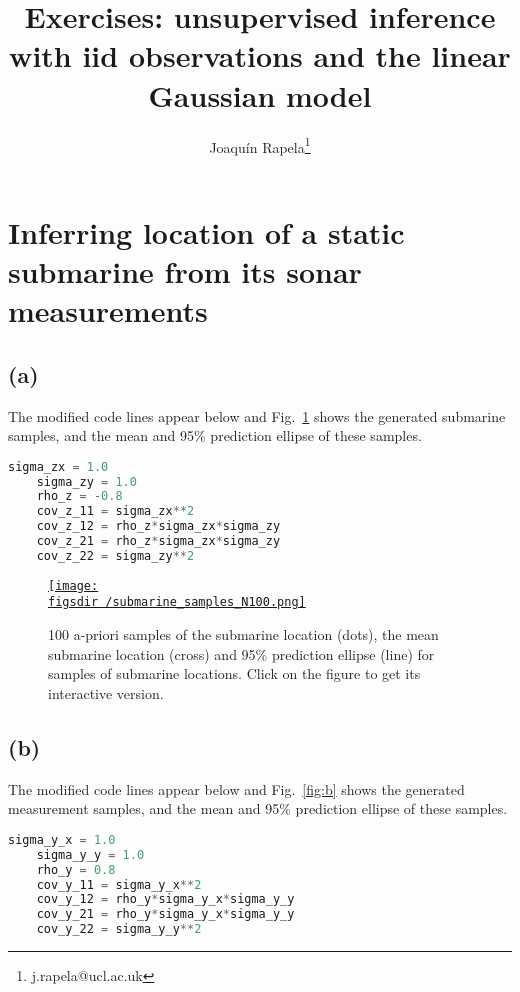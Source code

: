 \documentclass[12pt]{article}
\def\figsdir{../../../../../../code/scripts/probability/unsupervisedInferenceInTheLinearGaussianModel/figures/}
\def\figsURLdir{http://www.gatsby.ucl.ac.uk/~rapela/gcnuBridging2023/lectures/9_inference/inferenceInTheLinearGaussianModel/exercises/figures/}
\begin{document}
\title{Exercises: unsupervised inference with iid observations and the linear Gaussian model}
\author{Joaqu\'{i}n Rapela\thanks{j.rapela@ucl.ac.uk}}

\maketitle

\section{Inferring location of a static submarine from its sonar
measurements}

\subsection*{(a)} The modified code lines appear below and Fig.~\ref{fig:a}
shows the generated submarine samples, and the mean and 95\% prediction ellipse
of these samples.

\begin{lstlisting}[language=Python,frame=single]
    sigma_zx = 1.0
    sigma_zy = 1.0
    rho_z = -0.8
    cov_z_11 = sigma_zx**2
    cov_z_12 = rho_z*sigma_zx*sigma_zy
    cov_z_21 = rho_z*sigma_zx*sigma_zy
    cov_z_22 = sigma_zy**2
\end{lstlisting}

\begin{center}
    \begin{figure}[H]
        \href{\figsURLdir/submarine_samples_N100.html}{\texttt{[image: \\figsdir /submarine\_samples\_N100.png]}}

        \caption{100 a-priori samples of the submarine location (dots), the
        mean submarine location (cross) and 95\% prediction ellipse (line) for
        samples of submarine locations. Click on the figure to get its
        interactive version.}

        \label{fig:a}
    \end{figure}
\end{center}

\subsection*{(b)} The modified code lines appear below and Fig.~\ref{fig:b}
shows the generated measurement samples, and the mean and 95\% prediction
ellipse of these samples.

\begin{lstlisting}[language=Python,frame=single]
    sigma_y_x = 1.0
    sigma_y_y = 1.0
    rho_y = 0.8
    cov_y_11 = sigma_y_x**2
    cov_y_12 = rho_y*sigma_y_x*sigma_y_y
    cov_y_21 = rho_y*sigma_y_x*sigma_y_y
    cov_y_22 = sigma_y_y**2
\end{lstlisting}
\end{document}

